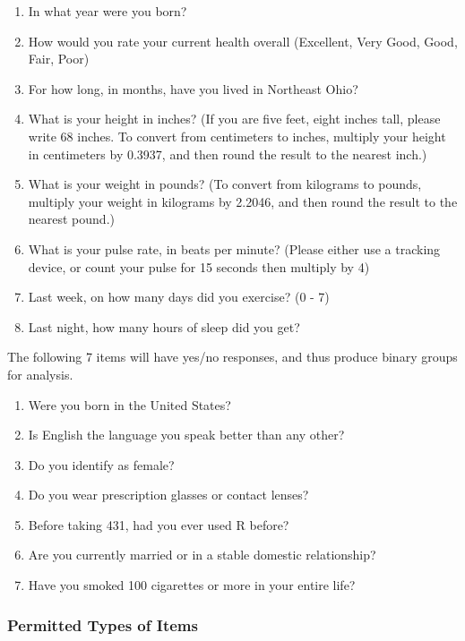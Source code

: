 \documentclass[]{book}
\providecommand{\tightlist}{%
  \setlength{\itemsep}{0pt}\setlength{\parskip}{0pt}}
\theoremstyle{definition}
\theoremstyle{definition}
\theoremstyle{definition}
\theoremstyle{remark}
\begin{document}
\begin{enumerate}
\def\labelenumi{\arabic{enumi}.}
\tightlist
\item
  In what year were you born?
\item
  How would you rate your current health overall (Excellent, Very Good,
  Good, Fair, Poor)
\item
  For how long, in months, have you lived in Northeast Ohio?
\item
  What is your height in inches? (If you are five feet, eight inches
  tall, please write 68 inches. To convert from centimeters to inches,
  multiply your height in centimeters by 0.3937, and then round the
  result to the nearest inch.)
\item
  What is your weight in pounds? (To convert from kilograms to pounds,
  multiply your weight in kilograms by 2.2046, and then round the result
  to the nearest pound.)
\item
  What is your pulse rate, in beats per minute? (Please either use a
  tracking device, or count your pulse for 15 seconds then multiply by
  4)
\item
  Last week, on how many days did you exercise? (0 - 7)
\item
  Last night, how many hours of sleep did you get?
\end{enumerate}

The following 7 items will have yes/no responses, and thus produce
binary groups for analysis.

\begin{enumerate}
\def\labelenumi{\arabic{enumi}.}
\tightlist
\item
  Were you born in the United States?
\item
  Is English the language you speak better than any other?
\item
  Do you identify as female?
\item
  Do you wear prescription glasses or contact lenses?
\item
  Before taking 431, had you ever used R before?
\item
  Are you currently married or in a stable domestic relationship?
\item
  Have you smoked 100 cigarettes or more in your entire life?
\end{enumerate}

\hypertarget{permitted-types-of-items}{%
\subsubsection{Permitted Types of
Items}\label{permitted-types-of-items}}
\end{document}
